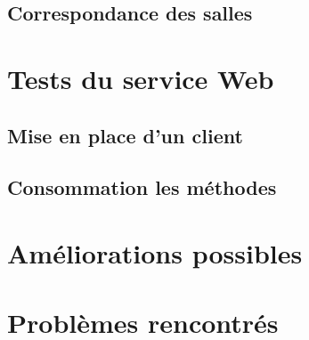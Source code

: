 \subsection{Correspondance des salles}

\section{Tests du service Web}

\subsection{Mise en place d'un client}

\subsection{Consommation les m\'ethodes}

\section{Am\'eliorations possibles}

\section{Probl\`emes rencontr\'es}


\clearpage
